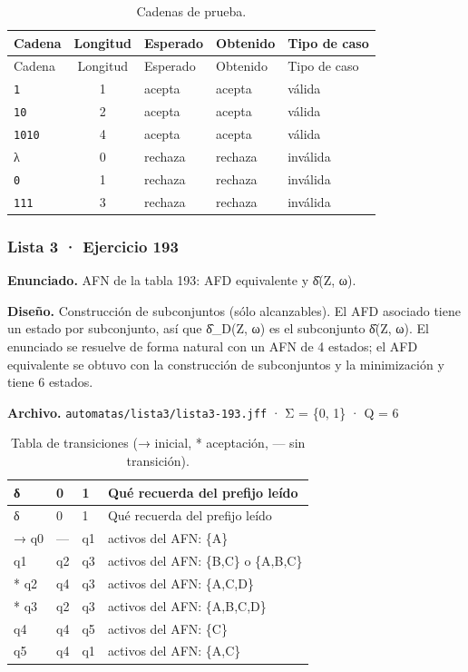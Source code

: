 \begin{longtable}[]{@{}lclll@{}}
\caption{Cadenas de prueba.}\tabularnewline
\toprule\noalign{}
Cadena & Longitud & Esperado & Obtenido & Tipo de caso \\
\midrule\noalign{}
\endfirsthead
\toprule\noalign{}
Cadena & Longitud & Esperado & Obtenido & Tipo de caso \\
\midrule\noalign{}
\endhead
\bottomrule\noalign{}
\endlastfoot
\texttt{1} & 1 & acepta & acepta & válida \\
\texttt{10} & 2 & acepta & acepta & válida \\
\texttt{1010} & 4 & acepta & acepta & válida \\
λ & 0 & rechaza & rechaza & inválida \\
\texttt{0} & 1 & rechaza & rechaza & inválida \\
\texttt{111} & 3 & rechaza & rechaza & inválida \\
\end{longtable}


\hypertarget{lista-3-ejercicio-193}{%
\subsubsection{Lista 3 · Ejercicio 193}\label{lista-3-ejercicio-193}}

\textbf{Enunciado.} AFN de la tabla 193: AFD equivalente y δ̂(Z, ω).

\textbf{Diseño.} Construcción de subconjuntos (sólo alcanzables). El AFD asociado tiene un estado por subconjunto, así que δ̂\_D(Z, ω) es el subconjunto δ̂(Z, ω). El enunciado se resuelve de forma natural con un AFN de 4 estados; el AFD equivalente se obtuvo con la construcción de subconjuntos y la minimización y tiene 6 estados.

\textbf{Archivo.} \texttt{automatas/lista3/lista3-193.jff} · Σ = \{0, 1\} · \textbar Q\textbar{} = 6

\begin{longtable}[]{@{}llll@{}}
\caption{Tabla de transiciones (→ inicial, * aceptación, --- sin transición).}\tabularnewline
\toprule\noalign{}
δ & 0 & 1 & Qué recuerda del prefijo leído \\
\midrule\noalign{}
\endfirsthead
\toprule\noalign{}
δ & 0 & 1 & Qué recuerda del prefijo leído \\
\midrule\noalign{}
\endhead
\bottomrule\noalign{}
\endlastfoot
→ q0 & --- & q1 & activos del AFN: \{A\} \\
q1 & q2 & q3 & activos del AFN: \{B,C\} o \{A,B,C\} \\
* q2 & q4 & q3 & activos del AFN: \{A,C,D\} \\
* q3 & q2 & q3 & activos del AFN: \{A,B,C,D\} \\
q4 & q4 & q5 & activos del AFN: \{C\} \\
q5 & q4 & q1 & activos del AFN: \{A,C\} \\
\end{longtable}

